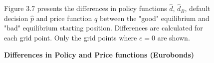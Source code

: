 \begin{figure}[H] \label{fig:mult eurobond}
 \caption{\textbf{Differences in Policy and Price functions (Eurobonds)}}
       \begin{tablenotes}
      \footnotesize
      \item Figure 3.7 presents the differences in policy functions $\hat{d}$, $\hat{d}_B$, default decision $\hat{p}$ and price function $q$ between the "good" equilibrium and "bad" equilibrium starting position. Differences are calculated for each grid point. Only the grid points where $e = 0$ are shown.
    \end{tablenotes}
\end{figure}
